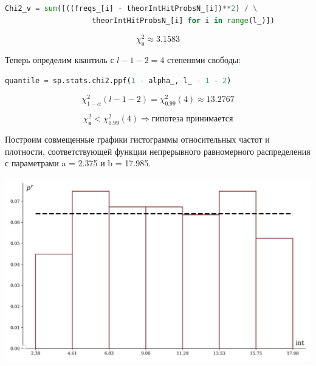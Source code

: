 \documentclass[a4paper, 14pt]{extarticle}
\begin{document}
\begin{center}
    \begin{lstlisting}[language=Python]
Chi2_v = sum([((freqs_[i] - theorIntHitProbsN_[i])**2) / \
                    theorIntHitProbsN_[i] for i in range(l_)])
    \end{lstlisting}
\end{center}

\vspace{-20pt}

\begin{equation*}
    \chi^2_{\text{в}} \approx 3.1583
\end{equation*}

\vspace{10pt}

Теперь определим квантиль с $l - 1 - 2 = 4$ степенями свободы:

\begin{center}
    \begin{lstlisting}[language=Python]
quantile = sp.stats.chi2.ppf(1 - alpha_, l_ - 1 - 2)
    \end{lstlisting}
\end{center}

\vspace{-20pt}

\begin{equation*}
    \chi_{1 - \alpha}^2 (l - 1 - 2) = \chi_{0.99}^2 (4) \approx 13.2767
\end{equation*}

\begin{equation*}
    \chi^2_{\text{в}} < \chi_{0.99}^2 (4) \Rightarrow \text{гипотеза принимается}
\end{equation*}

\vspace{10pt}

Построим совмещенные графики гистограммы относительных частот и плотности, 
соответствующей функции непрерывного равномерного распределения с 
параметрами a = 2.375 и b = 17.985.

\begin{center}
    \includegraphics[width=\textwidth, height=\textheight, keepaspectratio]{hist} \\
\end{center}
\end{document}
